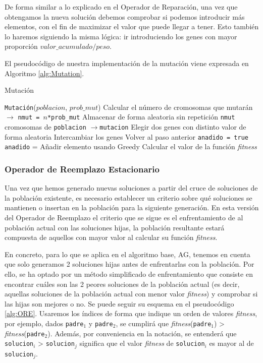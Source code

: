 De forma similar a lo explicado en el Operador de Reparación, una vez que obtengamos la nueva solución debemos comprobar si podemos introducir más elementos, con el fin de maximizar el valor que puede llegar a tener. 
Esto también lo haremos siguiendo la misma lógica: ir introduciendo los genes con mayor proporción $valor\_acumulado/peso$. 

El pseudocódigo de nuestra implementación de la mutación viene expresada en Algoritmo \ref{alg:Mutation}. 

\begin{algorithm}[h]
\caption{Mutación}\label{alg:Mutation}
\begin{algorithmic}[1]
\Procedure \texttt{Mutación}($poblacion$, $prob\_mut$)
\State Calcular el número de cromosomas que mutarán $\xrightarrow{}{}$ \texttt{nmut = $n$*prob\_mut}
\State Almacenar de forma aleatoria sin repetición \texttt{nmut} cromosomas de \texttt{poblacion} $\xrightarrow{}{}$\texttt{mutacion}
	\State Elegir dos genes con distinto valor de forma aleatoria
		\State Intercambiar los genes
	\Else
		\State Volver al paso anterior
	\EndIf
	\State \texttt{anadido = true} 
		\State \texttt{anadido} = Añadir elemento usando Greedy
	\EndWhile
	\State Calcular el valor de la función \textit{fitness}
\EndFor
\EndProcedure
\end{algorithmic}
\end{algorithm}

\subsubsection{Operador de Reemplazo Estacionario}

Una vez que hemos generado nuevas soluciones a partir del cruce de soluciones de la población existente, es necesario establecer un criterio sobre qué soluciones se mantienen o insertan en la población para la siguiente generación. 
En esta versión del Operador de Reemplazo el criterio que se sigue es el enfrentamiento de al población actual con las soluciones hijas, la población resultante estará compuesta de aquellos con mayor valor al calcular su función \textit{fitness}. 

En concreto, para lo que se aplica en el algoritmo base, AG, tenemos en cuenta que solo generamos 2 soluciones hijas antes de enfrentarlas con la población. 
Por ello, se ha optado por un método simplificado de enfrentamiento que consiste en encontrar cuáles son las 2 peores soluciones de la población actual (es decir, aquellas soluciones de la población actual con menor valor \textit{fitness}) y comprobar si las hijas son mejores o no. 
Se puede seguir su esquema en el pseudocódigo \ref{alg:ORE}. 
Usaremos los índices de forma que indique un orden de valores \textit{fitness}, por ejemplo, dados \texttt{padre$_1$} y  \texttt{padre$_2$}, se cumplirá que \textit{fitness}(\texttt{padre$_1$}) > \textit{fitness}(\texttt{padre$_2$}). 
Además, por conveniencia en la notación, se entenderá que \texttt{solucion$_i$} > \texttt{solucion$_j$} significa que el valor \textit{fitness} de \texttt{solucion$_i$} es mayor al de \texttt{solucion$_j$}.

